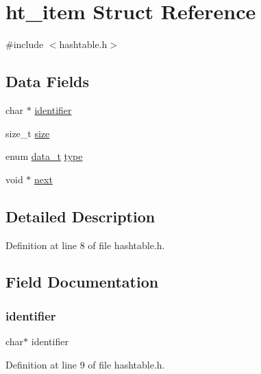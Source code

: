 \hypertarget{structht__item}{}\section{ht\+\_\+item Struct Reference}
\label{structht__item}


{\ttfamily \#include $<$hashtable.\+h$>$}

\subsection*{Data Fields}
\begin{DoxyCompactItemize}
\item 
char $\ast$ \mbox{\hyperlink{structht__item_af5351a0143adaf16c64b881aee01d893}{identifier}}
\item 
size\+\_\+t \mbox{\hyperlink{structht__item_a854352f53b148adc24983a58a1866d66}{size}}
\item 
enum \mbox{\hyperlink{hashtable_8h_adb5f3584b941a8dc0fed6b7302b4b8eb}{data\+\_\+t}} \mbox{\hyperlink{structht__item_a0c6169f5c94682132bbbe974784559e6}{type}}
\item 
void $\ast$ \mbox{\hyperlink{structht__item_a75b19ffcca77bfc647ff02695958fd95}{next}}
\end{DoxyCompactItemize}


\subsection{Detailed Description}


Definition at line 8 of file hashtable.\+h.



\subsection{Field Documentation}
\mbox{\label{structht__item_af5351a0143adaf16c64b881aee01d893}} 
\subsubsection{\texorpdfstring{identifier}{identifier}}
{\footnotesize\ttfamily char$\ast$ identifier}



Definition at line 9 of file hashtable.\+h.

